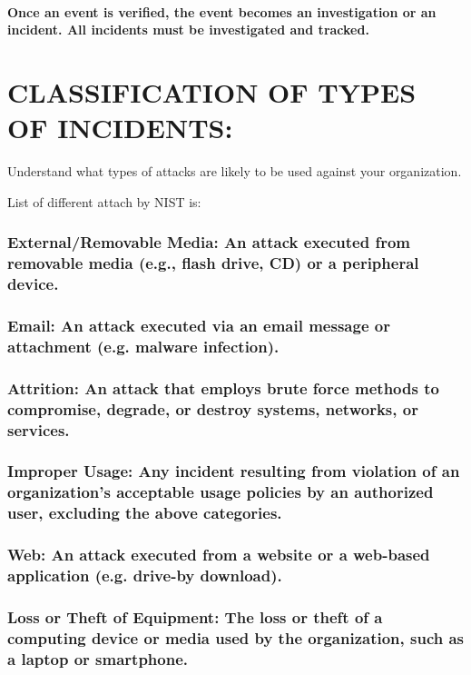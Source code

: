 \documentclass[10pt,british,english]{article}
\begin{document}
\paragraph{Once an event is verified, the event becomes an investigation or
an incident. All incidents must be investigated and tracked.}

\section{CLASSIFICATION OF TYPES OF INCIDENTS:}

Understand what types of attacks are likely to be used against your
organization. 

List of different attach by NIST is:

\subsubsection{External/Removable Media: An attack executed from removable media
(e.g., flash drive, CD) or a peripheral device.}

\subsubsection{Email: An attack executed via an email message or attachment (e.g.
malware infection).}

\subsubsection{Attrition: An attack that employs brute force methods to compromise,
degrade, or destroy systems, networks, or services. }

\subsubsection{Improper Usage: Any incident resulting from violation of an organization\textquoteright s
acceptable usage policies by an authorized user, excluding the above
categories.}

\subsubsection{Web: An attack executed from a website or a web-based application
(e.g. drive-by download).}

\subsubsection{Loss or Theft of Equipment: The loss or theft of a computing device
or media used by the organization, such as a laptop or smartphone.}
\end{document}
